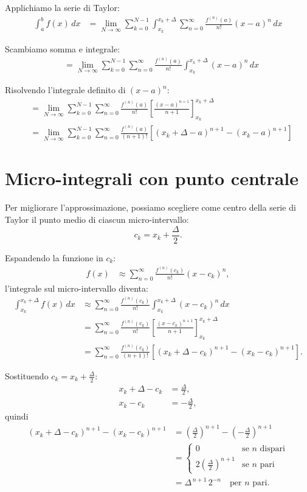 \documentclass[10pt]{extarticle}
\begin{document}
Applichiamo la serie di Taylor:
\begin{align*}
    \int_a^b f(x) \, dx 
    &= \lim_{N \to \infty} \sum_{k=0}^{N-1} \int_{x_k}^{x_k + \Delta} \sum_{n=0}^{\infty} \frac{f^{(n)}(a)}{n!} (x-a)^n \, dx
\end{align*}

Scambiamo somma e integrale:
\begin{align*}
    &= \lim_{N \to \infty} \sum_{k=0}^{N-1} \sum_{n=0}^{\infty} \frac{f^{(n)}(a)}{n!} \int_{x_k}^{x_k + \Delta} (x-a)^n \, dx
\end{align*}

Risolvendo l’integrale definito di \((x-a)^n\):
\begin{align*}
    &= \lim_{N \to \infty} \sum_{k=0}^{N-1} \sum_{n=0}^{\infty} \frac{f^{(n)}(a)}{n!} \left[ \frac{(x-a)^{n+1}}{n+1} \right]_{x_k}^{x_k+\Delta} \\
    &= \lim_{N \to \infty} \sum_{k=0}^{N-1} \sum_{n=0}^{\infty} \frac{f^{(n)}(a)}{(n+1)!} \left[ (x_k+\Delta-a)^{n+1} - (x_k-a)^{n+1} \right]
\end{align*}

\section{Micro-integrali con punto centrale}
Per migliorare l'approssimazione, possiamo scegliere come centro della serie di Taylor il punto medio di ciascun micro-intervallo:
\[
c_k = x_k + \frac{\Delta}{2}.
\]

Espandendo la funzione in \(c_k\):
\begin{align*}
f(x) &\approx \sum_{n=0}^{\infty} \frac{f^{(n)}(c_k)}{n!} (x - c_k)^n,
\end{align*}
l'integrale sul micro-intervallo diventa:
\begin{align*}
\int_{x_k}^{x_k+\Delta} f(x) \, dx 
&\approx \sum_{n=0}^{\infty} \frac{f^{(n)}(c_k)}{n!} \int_{x_k}^{x_k+\Delta} (x - c_k)^n \, dx \\
&= \sum_{n=0}^{\infty} \frac{f^{(n)}(c_k)}{n!} \left[ \frac{(x - c_k)^{n+1}}{n+1} \right]_{x_k}^{x_k+\Delta} \\
&= \sum_{n=0}^{\infty} \frac{f^{(n)}(c_k)}{(n+1)!} \left[ (x_k+\Delta-c_k)^{n+1} - (x_k-c_k)^{n+1} \right].
\end{align*}

Sostituendo \(c_k = x_k + \frac{\Delta}{2}\):
\begin{align*}
x_k+\Delta - c_k &= \frac{\Delta}{2}, \\
x_k - c_k &= -\frac{\Delta}{2},
\end{align*}
quindi
\begin{align*}
(x_k+\Delta-c_k)^{n+1} - (x_k-c_k)^{n+1} &= \left(\frac{\Delta}{2}\right)^{n+1} - \left(-\frac{\Delta}{2}\right)^{n+1} \\
&= \begin{cases} 0 & \text{se $n$ dispari} \\[2mm]
2 \left(\frac{\Delta}{2}\right)^{n+1} & \text{se $n$ pari} \end{cases} \\
&= \Delta^{\,n+1} \, 2^{-n} \quad \text{per $n$ pari}.
\end{align*}
\end{document}
